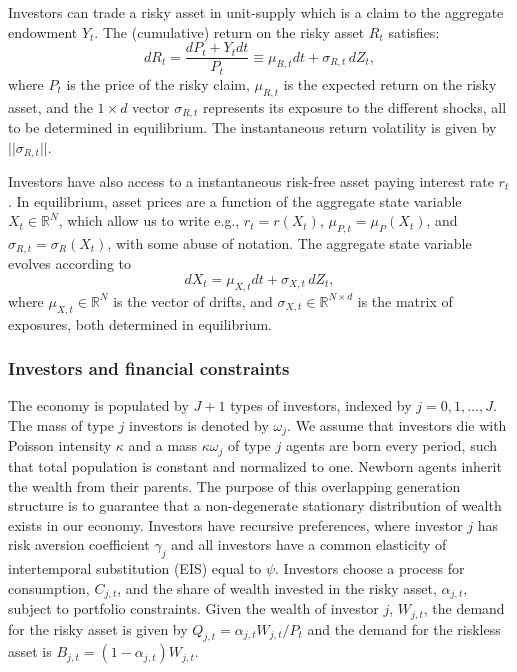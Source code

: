 Investors can trade a risky asset in unit-supply which is a claim to the aggregate endowment $Y_t$. The (cumulative) return on the risky asset $R_t$ satisfies:
\begin{equation}\label{eq:risky-asser-ret}
    d R_t = \frac{d P_t + Y_t dt}{P_t} \equiv \mu_{R,t} dt + \sigma_{R,t}\, d Z_t,
\end{equation}
where $P_t$ is the price of the risky claim, $\mu_{R,t}$ is the expected return on the risky asset, and the $1\times d$ vector $\sigma_{R,t}$ represents its exposure to the different shocks, all to be determined in equilibrium. The instantaneous return volatility is given by $||\sigma_{R,t}||$.

Investors have also access to a instantaneous risk-free asset paying interest rate $r_t$. In equilibrium, asset prices are a function of the aggregate state variable $X_t\in \mathbb{R}^{N}$, which allow us to write e.g., $r_t = r(X_t)$, $\mu_{P,t} = \mu_P(X_t)$, and $\sigma_{R,t} = \sigma_R(X_t)$, with some abuse of notation. The aggregate state variable evolves according to
\begin{equation}
    d X_t = \mu_{X,t} dt + \sigma_{X,t}\, d Z_t,
\end{equation}
where $\mu_{X,t} \in \mathbb{R}^N$ is the vector of drifts, and $\sigma_{X,t} \in \mathbb{R}^{N\times d}$ is the matrix of exposures, both determined in equilibrium. 

\subsubsection{Investors and financial constraints}

The economy is populated by $J+1$ types of investors, indexed by $j = 0, 1, \ldots, J$. The mass of type $j$ investors is denoted by $\omega_j$. We assume that investors die with Poisson intensity $\kappa$ and a mass $\kappa \omega_j$ of type $j$ agents are born every period, such that total population is constant and normalized to one. 
Newborn agents inherit the wealth from their parents.
The purpose of this overlapping generation structure is to guarantee that a non-degenerate stationary distribution of wealth exists in our economy. 
Investors have \citet{duffie1992stochastic} recursive preferences, where investor $j$ has risk aversion coefficient $\gamma_j$ and all investors have a common elasticity of intertemporal substitution (EIS) equal to $\psi$. Investors choose a process for consumption, $C_{j,t}$, and the share of wealth invested in the risky asset, $\alpha_{j,t}$, subject to portfolio constraints.
Given the wealth of investor $j$, $W_{j,t}$, the demand for the risky asset is given by $Q_{j,t} = \alpha_{j,t} W_{j,t} / P_t$ and the demand for the riskless asset is $B_{j,t} = (1-\alpha_{j,t}) W_{j,t}$.



